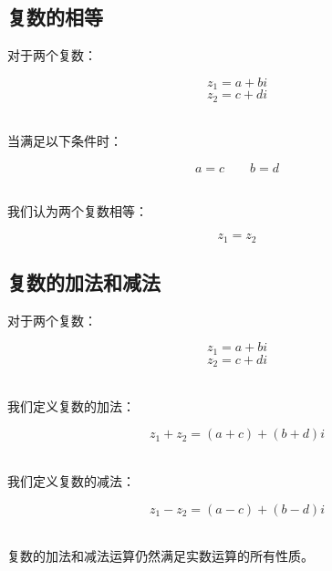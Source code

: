 \documentclass[UTF8]{ctexart}
\begin{document}
\subsection{复数的相等}
    对于两个复数：
    \begin{large}
        \begin{equation*}
            z_1=a+bi
        \end{equation*}
        \begin{equation*}
            z_2=c+di
        \end{equation*}
    \end{large}\\
    当满足以下条件时：
    \begin{large}
        \begin{equation*}
            a=c\qquad b=d
        \end{equation*}
    \end{large}\\
    我们认为两个复数相等：
    \begin{large}
        \begin{equation*}
            z_1=z_2
        \end{equation*}
    \end{large}

\subsection{复数的加法和减法}
    对于两个复数：
    \begin{large}
        \begin{equation*}
            z_1=a+bi
        \end{equation*}
        \begin{equation*}
            z_2=c+di
        \end{equation*}
    \end{large}\\
    我们定义复数的加法：
    \begin{large}
        \begin{equation*}
            z_1+z_2=(a+c)+(b+d)i
        \end{equation*}
    \end{large}\\
    我们定义复数的减法：
    \begin{large}
        \begin{equation*}
            z_1-z_2=(a-c)+(b-d)i
        \end{equation*}
    \end{large}\\[1mm]
    复数的加法和减法运算仍然满足实数运算的所有性质。
\end{document}
